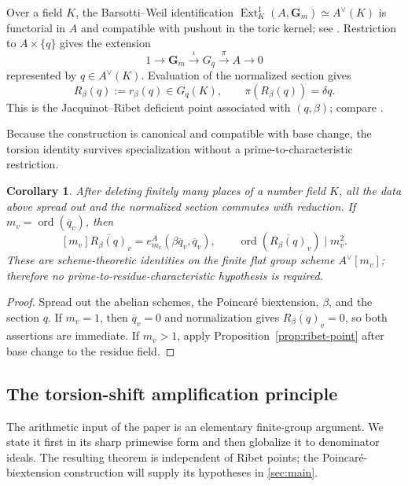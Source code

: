 \documentclass[11pt,letterpaper,reqno]{amsart}
\newtheorem{corollary}[theorem]{Corollary}
\theoremstyle{definition}
\theoremstyle{remark}
\newcommand{\Gm}{\mathbf G_m}
\newcommand{\ord}{\operatorname{ord}}
\newcommand{\Ext}{\operatorname{Ext}}
\begin{document}
Over a field $K$, the Barsotti--Weil identification
$\Ext_K^1(A,\Gm)\simeq A^\vee(K)$ is functorial in $A$ and compatible with
pushout in the toric kernel; see \cite[Chapter~VII, \S3]{Serre1988}.
Restriction to $A\times\{q\}$ gives the extension
\begin{equation}\label{eq:extension-Gq}
 1\longrightarrow\Gm\xrightarrow{\iota}G_q\xrightarrow{\pi}A
 \longrightarrow0
\end{equation}
represented by $q\in A^\vee(K)$.  Evaluation of the normalized section gives
\[
 R_\beta(q):=r_\beta(q)\in G_q(K),
 \qquad \pi(R_\beta(q))=\delta q.
\]
This is the Jacquinot--Ribet deficient point associated with $(q,\beta)$;
compare \cite{JacquinotRibet1987,Bertrand2011,
BertrandMasserPillayZannier2016}.

Because the construction is canonical and compatible with base change, the
torsion identity survives specialization without a prime-to-characteristic
restriction.

\begin{corollary}\label{cor:ribet-reduction}
After deleting finitely many places of a number field $K$, all the data above
spread out and the normalized section commutes with reduction.  If
$m_v=\ord(\overline q_v)$, then
\[
 [m_v]\overline{R_\beta(q)}_v
 =e_{m_v}^A(\beta\overline q_v,\overline q_v),
 \qquad
 \ord(\overline{R_\beta(q)}_v)\mid m_v^2.
\]
These are scheme-theoretic identities on the finite flat group scheme
$A^\vee[m_v]$; therefore no prime-to-residue-characteristic hypothesis is
required.
\end{corollary}

\begin{proof}
Spread out the abelian schemes, the Poincar\'e biextension, $\beta$, and the
section $q$.  If $m_v=1$, then $\overline q_v=0$ and normalization gives
$\overline{R_\beta(q)}_v=0$, so both assertions are immediate.  If $m_v>1$,
apply Proposition~\ref{prop:ribet-point} after base change to the residue field.
\end{proof}

\subsection{The torsion-shift amplification principle}\label{sec:finite}

The arithmetic input of the paper is an elementary finite-group argument.  We
state it first in its sharp primewise form and then globalize it to denominator
ideals.  The resulting theorem is independent of Ribet points; the
Poincar\'e-biextension construction will supply its hypotheses in
\cref{sec:main}.
\end{document}
